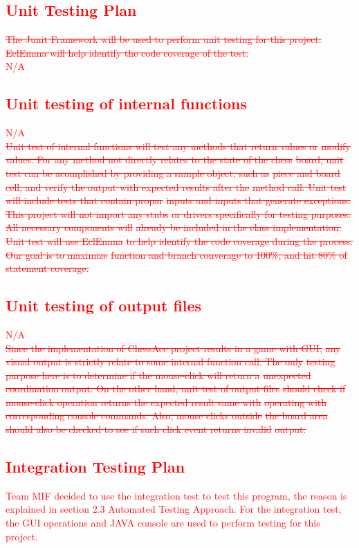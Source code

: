 \documentclass[12pt, titlepage]{article}
\begin{document}
\textcolor{red}{
\section{Unit Testing Plan}}
\textcolor{red}{
\sout{The Junit Framework will be used to perform unit testing for this project.}
\sout{EclEmma will help identify the code coverage of the test.}\\
N/A
}
\textcolor{red}{
\subsection{Unit testing of internal functions}
N/A\\
\sout{Unit test of internal functions will test any methods that return values or}
\sout{modify values. For any method not directly relates to the state of the chess}
\sout{board, unit test can be acomplished by providing a sample object, such as }
\sout{piece and board cell, and verify the output with expected results after the }
\sout{method call. Unit test will include tests that contain propar}
\sout{inputs and inputs that generate exceptions. This project will not import any stubs} 
\sout{or drivers specifically for testing purposes. All necessary components will }
\sout{already be included in the class implementation. Unit test will use EclEmma }
\sout{to help identify the code coverage during the process. Our goal is to maximize }
\sout{function and branch converage to 100\%, and hit 80\% of statement coverage.}
}
\textcolor{red}{
\subsection{Unit testing of output files}
N/A\\
\sout{Since the implementation of ChessAce project results in a game with GUI,} 
\sout{any visual output is strictly relate to some internal function call. The only }
\sout{testing purpose here is to determine if the mouse-click will return a }
\sout{unexpected coordination output. On the other hand, unit test of output files }
\sout{should check if mouse-click operation returns the expected result same with }
\sout{operating with corresponding console commands. Also, mouse clicks outside }
\sout{the board area should also be checked to see if such click event returns invalid }
\sout{output.}
}
\newpage
\textcolor{red}{
\section{Integration Testing Plan}
}
\textcolor{red}{
Team MIF decided to use the integration test to test this program, the reason is explained in section 2.3 Automated Testing Approach. For the integration test, the GUI operations and JAVA console are used to perform testing for this project.
}
\end{document}
